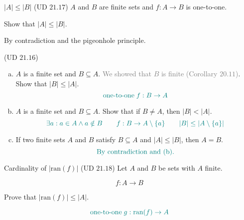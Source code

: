 \begin{frame}{}
  \begin{exampleblock}{$|A| \le |B|$ (UD $21.17$)}
    $A$ and $B$ are finite sets and $f: A \to B$ is one-to-one. 
    
    Show that $|A| \le |B|$.
  \end{exampleblock}

  \pause
  \vspace{0.60cm}
  \centerline{By contradiction and the pigeonhole principle.}
\end{frame}

\begin{frame}{}
  \begin{exampleblock}{(UD $21.16$)}
    \begin{enumerate}[(a)]
      \item $A$ is a finite set and $B \subseteq A$. \textcolor{gray}{We showed that $B$ is finite (Corollary $20.11$)}. Show that $|B| \le |A|$.
	\pause
	\[
	  \textcolor{teal}{\text{one-to-one} \;f: B \to A}
	\]
      \item \pause $A$ is a finite set and $B \subseteq A$. Show that if $B \neq A$, then $|B| < |A|$.
	\pause
	\[
	  \textcolor{teal}{\exists a: a \in A \land a \notin B \qquad f: B \to A \setminus \{a\} \qquad |B| \le |A \setminus \{a\}|}
	\]
      \item \pause If two finite sets $A$ and $B$ satisfy $B \subseteq A$ and $|A| \le |B|$, then $A = B$.
	\pause
	\[
	  \textcolor{teal}{\text{By contradiction and (b).}}
	\]
    \end{enumerate}
  \end{exampleblock}
\end{frame}

\begin{frame}{}
  \begin{exampleblock}{Cardinality of $|\text{ran}(f)|$ (UD $21.18$)}
    Let $A$ and $B$ be sets with $A$ finite.

    \[
      f: A \to B
    \]

    Prove that $|\text{ran}(f)| \le |A|$.
  \end{exampleblock}

  \pause
  \vspace{0.50cm}
  \[
    \textcolor{teal}{\text{one-to-one} \;g: \text{ran}(f) \to A}
  \]
  \pause
  \centerline{}
\end{frame}

